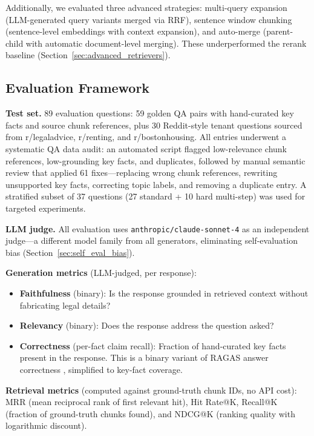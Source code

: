 \documentclass{article}
\begin{document}
Additionally, we evaluated three advanced strategies: multi-query expansion (LLM-generated query variants merged via RRF), sentence window chunking (sentence-level embeddings with context expansion), and auto-merge (parent-child with automatic document-level merging). These underperformed the rerank baseline (Section~\ref{sec:advanced_retrievers}).

\subsection{Evaluation Framework}
\label{sec:eval_framework}

\textbf{Test set.} 89 evaluation questions: 59 golden QA pairs with hand-curated key facts and source chunk references, plus 30 Reddit-style tenant questions sourced from r/legaladvice, r/renting, and r/bostonhousing. All entries underwent a systematic QA data audit: an automated script flagged low-relevance chunk references, low-grounding key facts, and duplicates, followed by manual semantic review that applied 61 fixes---replacing wrong chunk references, rewriting unsupported key facts, correcting topic labels, and removing a duplicate entry. A stratified subset of 37 questions (27 standard + 10 hard multi-step) was used for targeted experiments.

\textbf{LLM judge.} All evaluation uses \texttt{anthropic/claude-sonnet-4} as an independent judge---a different model family from all generators, eliminating self-evaluation bias (Section~\ref{sec:self_eval_bias}).

\textbf{Generation metrics} (LLM-judged, per response):
\begin{itemize}
    \item \textbf{Faithfulness} (binary): Is the response grounded in retrieved context without fabricating legal details?
    \item \textbf{Relevancy} (binary): Does the response address the question asked?
    \item \textbf{Correctness} (per-fact claim recall): Fraction of hand-curated key facts present in the response. This is a binary variant of RAGAS answer correctness \citep{es2024ragas}, simplified to key-fact coverage.
\end{itemize}

\textbf{Retrieval metrics} (computed against ground-truth chunk IDs, no API cost):
MRR (mean reciprocal rank of first relevant hit), Hit Rate@K, Recall@K (fraction of ground-truth chunks found), and NDCG@K (ranking quality with logarithmic discount).
\end{document}
